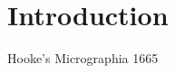 

\chapter*{Introduction}
\setcounter{page}{1}


Hooke's Micrographia 1665 \cite{hooke_micrographia:_1665}
